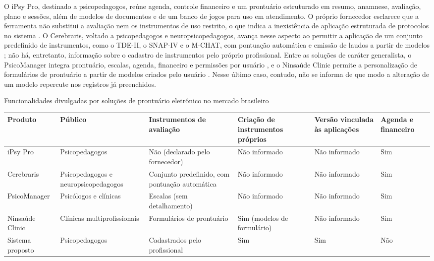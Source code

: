 O iPsy Pro, destinado a psicopedagogos, reúne agenda, controle financeiro e um prontuário estruturado em resumo, anamnese, avaliação, plano e sessões, além de modelos de documentos e de um banco de jogos para uso em atendimento. O próprio fornecedor esclarece que a ferramenta não substitui a avaliação nem os instrumentos de uso restrito, o que indica a inexistência de aplicação estruturada de protocolos no sistema \cite{ipsy_pro}. O Cerebraris, voltado a psicopedagogos e neuropsicopedagogos, avança nesse aspecto ao permitir a aplicação de um conjunto predefinido de instrumentos, como o TDE-II, o SNAP-IV e o M-CHAT, com pontuação automática e emissão de laudos a partir de modelos \cite{cerebraris}; não há, entretanto, informação sobre o cadastro de instrumentos pelo próprio profissional. Entre as soluções de caráter generalista, o PsicoManager integra prontuário, escalas, agenda, financeiro e permissões por usuário \cite{psicomanager}, e o Ninsaúde Clinic permite a personalização de formulários de prontuário a partir de modelos criados pelo usuário \cite{ninsaude_prontuario}. Nesse último caso, contudo, não se informa de que modo a alteração de um modelo repercute nos registros já preenchidos.

\begin{quadro}[H]
\centering
\footnotesize
\caption{Funcionalidades divulgadas por soluções de prontuário eletrônico no mercado brasileiro}
\begin{tabular}{|>{\raggedright\arraybackslash}p{2.0cm}|>{\raggedright\arraybackslash}p{2.5cm}|>{\raggedright\arraybackslash}p{2.6cm}|>{\raggedright\arraybackslash}p{2.2cm}|>{\raggedright\arraybackslash}p{2.4cm}|>{\raggedright\arraybackslash}p{1.6cm}|}
\hline
\textbf{Produto} & \textbf{Público} & \textbf{Instrumentos de avaliação} & \textbf{Criação de instrumentos próprios} & \textbf{Versão vinculada às aplicações} & \textbf{Agenda e financeiro} \\
\hline
iPsy Pro & Psicopedagogos & Não (declarado pelo fornecedor) & Não informado & Não informado & Sim \\ \hline
Cerebraris & Psicopedagogos e neuropsico\-pedagogos & Conjunto predefinido, com pontuação automática & Não informado & Não informado & Sim \\ \hline
PsicoManager & Psicólogos e clínicas & Escalas (sem detalhamento) & Não informado & Não informado & Sim \\ \hline
Ninsaúde Clinic & Clínicas multiprofissionais & Formulários de prontuário & Sim (modelos de formulário) & Não informado & Sim \\ \hline
Sistema proposto & Psicopedagogos & Cadastrados pelo profissional & Sim & Sim & Não \\
\hline
\end{tabular}
\label{qua:solucoes_mercado}
\end{quadro}

